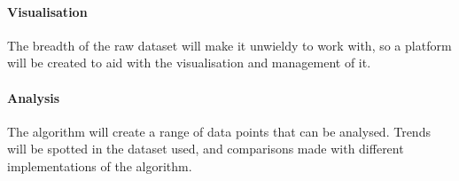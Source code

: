 \paragraph{Visualisation}
The breadth of the raw dataset will make it unwieldy to work with, so a platform will be created to aid with the visualisation and management of it.

\paragraph{Analysis}
The algorithm will create a range of data points that can be analysed. Trends will be spotted in the dataset used, and comparisons made with different implementations of the algorithm.
